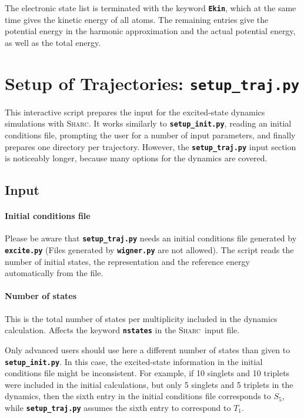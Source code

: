 \documentclass[a4paper,10pt,DIV=15,openany,twoside=false]{scrbook}
\newcommand{\sharc}{\textsc{Sharc}}
\newcommand{\ttt}[1]{\textbf{\texttt{#1}}}
\begin{document}
The electronic state list is terminated with the keyword \ttt{Ekin}, which at the same time gives the kinetic energy of all atoms. The remaining entries give the potential energy in the harmonic approximation and the actual potential energy, as well as the total energy.








\section{Setup of Trajectories: \ttt{setup\_traj.py}}\label{sec:setup_traj.py}

This interactive script prepares the input for the excited-state dynamics simulations with \sharc. It works similarly to \ttt{setup\_init.py}, reading an initial conditions file, prompting the user for a number of input parameters, and finally prepares one directory per trajectory. However, the \ttt{setup\_traj.py} input section is noticeably longer, because many options for the dynamics are covered.

\subsection{Input}

\paragraph{Initial conditions file}

Please be aware that \ttt{setup\_traj.py} needs an initial conditions file generated by \ttt{excite.py} (Files generated by \ttt{wigner.py} are not allowed). The script reads the number of initial states, the representation and the reference energy automatically from the file.

\paragraph{Number of states}

This is the total number of states per multiplicity included in the dynamics calculation. Affects the keyword \ttt{nstates} in the \sharc\ input file.

Only advanced users should use here a different number of states than given to \ttt{setup\_init.py}. In this case, the excited-state information in the initial conditions file might be inconsistent. For example, if 10 singlets and 10 triplets were included in the initial calculations, but only 5 singlets and 5 triplets in the dynamics, then the sixth entry in the initial conditions file corresponds to $S_5$, while \ttt{setup\_traj.py} assumes the sixth entry to correspond to $T_1$.
\end{document}
